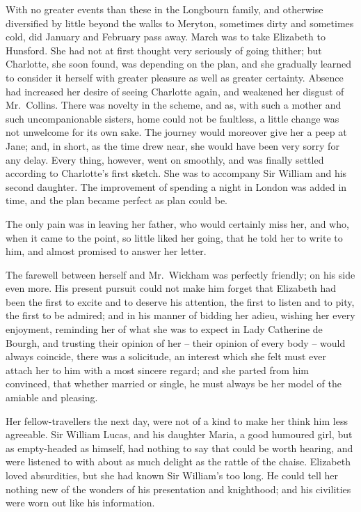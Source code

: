 
With no greater events than these in the Longbourn
family, and otherwise diversified by little beyond the walks
to Meryton, sometimes dirty and sometimes cold, did
January and February pass away. March was to take
Elizabeth to Hunsford. She had not at first thought very
seriously of going thither; but Charlotte, she soon found,
was depending on the plan, and she gradually learned to
consider it herself with greater pleasure as well as greater
certainty. Absence had increased her desire of seeing
Charlotte again, and weakened her disgust of Mr.\ Collins.
There was novelty in the scheme, and as, with such a
mother and such uncompanionable sisters, home could
not be faultless, a little change was not unwelcome for
its own sake. The journey would moreover give her a peep
at Jane; and, in short, as the time drew near, she would
have been very sorry for any delay. Every thing, however,
went on smoothly, and was finally settled according to
Charlotte’s first sketch. She was to accompany Sir William
and his second daughter. The improvement of spending
a night in London was added in time, and the plan became
perfect as plan could be.

The only pain was in leaving her father, who would
certainly miss her, and who, when it came to the point,
so little liked her going, that he told her to write to him,
and almost promised to answer her letter.

The farewell between herself and Mr.\ Wickham was
perfectly friendly; on his side even more. His present
pursuit could not make him forget that Elizabeth had
been the first to excite and to deserve his attention, the
first to listen and to pity, the first to be admired; and
in his manner of bidding her adieu, wishing her every
enjoyment, reminding her of what she was to expect in
Lady Catherine de Bourgh, and trusting their opinion of
her -- their opinion of every body -- would always coincide,
there was a solicitude, an interest which she felt must
ever attach her to him with a most sincere regard; and
she parted from him convinced, that whether married or
single, he must always be her model of the amiable and
pleasing.

Her fellow-travellers the next day, were not of a kind
to make her think him less agreeable. Sir William Lucas,
and his daughter Maria, a good humoured girl, but as
empty-headed as himself, had nothing to say that could
be worth hearing, and were listened to with about as much
delight as the rattle of the chaise. Elizabeth loved
absurdities, but she had known Sir William’s too long.
He could tell her nothing new of the wonders of his
presentation and knighthood; and his civilities were worn
out like his information.

